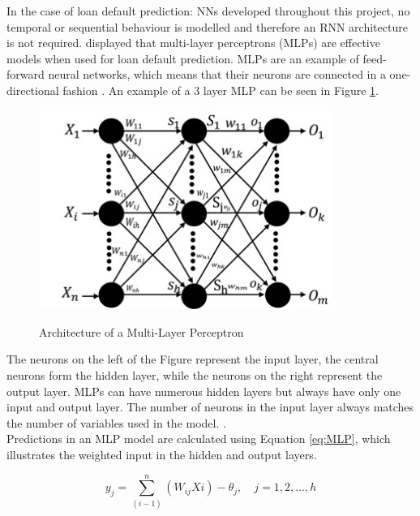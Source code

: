 In the case of loan default prediction: NNs developed throughout this project, no temporal or sequential behaviour is modelled and therefore an RNN architecture is not required. \textcite{NNWest} displayed that multi-layer perceptrons (MLPs) are effective models when used for loan default prediction. MLPs are an example of feed-forward neural networks, which means that their neurons are connected in a one-directional fashion \parencite{NNOverview}. An example of a 3 layer MLP can be seen in Figure \ref{fig:MLP}.

\vspace{10 pt}

\begin{figure}[!htb]
\centering
\includegraphics[width=0.85\textwidth]{images/mlp.jpg}
\caption{Architecture of a Multi-Layer Perceptron}
\label{fig:MLP}
\parencite{MLP}
\end{figure}

\vspace{10 pt}

The neurons on the left of the Figure represent the input layer, the central neurons form the hidden layer, while the neurons on the right represent the output layer. MLPs can have numerous hidden layers but always have only one input and output layer. The number of neurons in the input layer always matches the number of variables used in the model.  \parencite{MLP}. \\

Predictions in an MLP model are calculated using Equation \ref{eq:MLP}, which illustrates the weighted input in the hidden and output layers.

\vspace{10pt}

\begin{equation} \label{eq:MLP}
y_j = \sum_(i-1)^{n}(W_{ij} X{i}) - \theta_j, \quad  j = 1,2,...,h
\end{equation}


